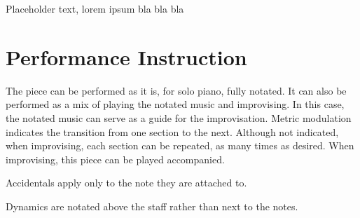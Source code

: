 \documentclass{article}
\begin{document}
Placeholder text, lorem ipsum bla bla bla

\section*{Performance Instruction}
The piece can be performed as it is, for solo piano, fully notated.
%
It can also be performed as a mix of playing the notated music and
improvising.
%
In this case, the notated music can serve as a guide for the
improvisation.
%
Metric modulation indicates the transition from one section to the next.
Although not indicated, when improvising, each section can be repeated,
as many times as desired.
%
When improvising, this piece can be played accompanied.

\noindent
Accidentals apply only to the note they are attached to.

\noindent
Dynamics are notated above the staff rather than next to the notes.
\end{document}
